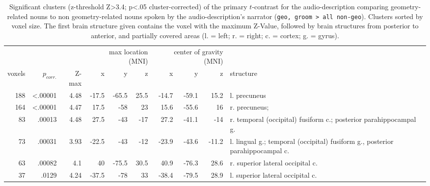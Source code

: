 \documentclass[english]{article}
\begin{document}
\begin{table}[h!]
    \caption{Significant clusters (z-threshold Z>3.4; p<.05 cluster-corrected)
        of the primary $t$-contrast for the audio-description comparing
        geometry-related nouns to non geometry-related nouns spoken by the
        audio-description's narrator (\texttt{geo, groom > all non-geo}).
        Clusters sorted by voxel size.
    The first brain structure given contains the voxel with the maximum Z-Value,
followed by brain structures from posterior to anterior, and partially covered
areas (l. = left; r. = right; c. = cortex; g. = gyrus).}
    \label{tab:res-ao-group1}
\begin{tabular}{rrrrrrrrrp{3cm}}
\toprule
& & & \multicolumn{3}{r}{max location (MNI)} & \multicolumn{3}{r}{center of gravity (MNI)} &
\\ \cmidrule{4-6} \cmidrule{7-9}
voxels & $p_{corr.}$ & Z-max & x & y & z  & x & y & z & structure \\
\midrule
188 & <.00001 & 4.48 & -17.5 & -65.5 & 25.5 & -14.7 & -59.1 & 15.2 & l.
precuneus \\ %
164 & <.00001 & 4.47 & 17.5 & -58 & 23 & 15.6 & -55.6 & 16 & r. precuneus;
\\ %
83 & .00013 & 4.48 & 27.5 & -43 & -17 & 27.2 & -41.1 & -14 & r. temporal
(occipital) fusiform c.; posterior parahippocampal g. \\ %
73 & .00031 & 3.93 & -22.5 & -43 & -12 & -23.9 & -43.6 & -11.2 & l. lingual
g.; temporal (occipital) fusiform g., posterior parahippocampal c. \\ %
63 & .00082 & 4.1 & 40 & -75.5 & 30.5 & 40.9 & -76.3 & 28.6 & r. superior
lateral occipital c. \\ %
37 & .0129 & 4.24 & -37.5 & -78 & 33 & -38.4 & -79.5 & 28.9 & l. superior
lateral occipital c. \\ %
\bottomrule
\end{tabular}
\end{table}


\end{document}

